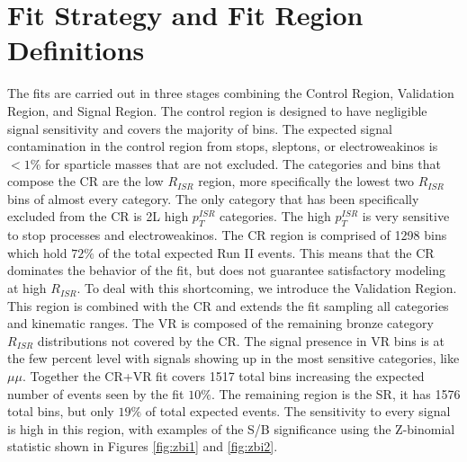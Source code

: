 \section{Fit Strategy and Fit Region Definitions}
The fits are carried out in three stages combining the Control Region, Validation Region, and Signal Region. The control region is designed to have negligible signal sensitivity and covers the majority of bins. The expected signal contamination in the control region from stops, sleptons, or electroweakinos is $<1\%$ for sparticle masses that are not excluded. The categories and bins that compose the CR are the low $R_{ISR}$ region,  more specifically the lowest two $R_{ISR}$ bins of almost every category. The only category that has been specifically excluded from the CR is 2L high $p_T^{ISR}$ categories. The high $p_T^{ISR}$ is very sensitive to stop processes and electroweakinos. The CR region is comprised of 1298 bins which hold $72\%$ of the total expected Run II events. This means that the CR dominates the behavior of the fit, but does not guarantee satisfactory modeling at high $R_{ISR}$. To deal with this shortcoming, we introduce the Validation Region. This region is combined with the CR and extends the fit sampling all categories and kinematic ranges. The VR is composed of the remaining bronze category $R_{ISR}$ distributions not covered by the CR. The signal presence in VR bins is at the few percent level with signals showing up in the most sensitive categories, like $\mu\mu$. Together the CR+VR fit covers 1517 total bins increasing the expected number of events seen by the fit $10\%$. The remaining region is the SR, it has 1576 total bins, but only $19\%$ of total expected events. The sensitivity to every signal is high in this region, with examples of the S/B significance using the Z-binomial statistic \cite{Cousins_2008} shown in Figures \ref{fig:zbi1} and \ref{fig:zbi2}.



